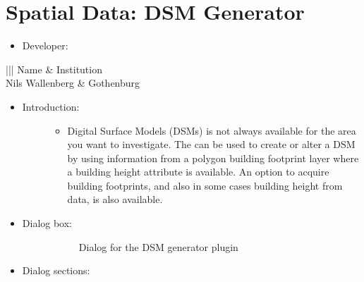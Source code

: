 \documentclass[letterpaper,10pt,english]{sphinxmanual}
\begin{document}
\section{Spatial Data: DSM Generator}
\label{\detokenize{pre-processor/Spatial Data DSM Generator:spatial-data-dsm-generator}}\label{\detokenize{pre-processor/Spatial Data DSM Generator:dsmgenerator}}\label{\detokenize{pre-processor/Spatial Data DSM Generator::doc}}\begin{itemize}
\item {} 
Developer:

\end{itemize}


\begin{savenotes}\sphinxattablestart
\centering
\begin{tabular}[t]{|||}
\hline
\sphinxstyletheadfamily 
Name
&\sphinxstyletheadfamily 
Institution
\\
\hline
Nils Wallenberg
&
Gothenburg
\\
\hline
\end{tabular}
\par
\sphinxattableend\end{savenotes}
\begin{itemize}
\item {} \begin{description}
\item[{Introduction:}] \leavevmode\begin{itemize}
\item {} 
Digital Surface Models (DSMs) is not always available for the area you want to investigate. The  can be used to create or alter a DSM by using information from a polygon building footprint layer where a building height attribute is available. An option to acquire building footprints, and also in some cases building height from  data, is also available.

\end{itemize}

\end{description}

\item {} \begin{description}
\item[{Dialog box:}] \leavevmode
\begin{figure}[htbp]
\centering
\capstart

\noindent{}
\caption{Dialog for the DSM generator plugin}\label{\detokenize{pre-processor/Spatial Data DSM Generator:id1}}\end{figure}

\end{description}

\item {} 
Dialog sections:

\end{itemize}
\end{document}
